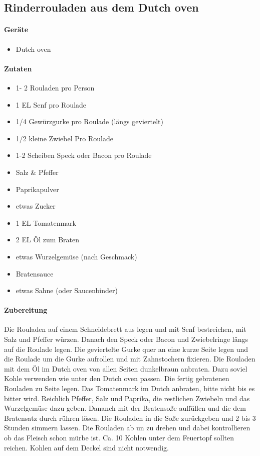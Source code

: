 \subsection{Rinderrouladen aus dem Dutch oven}

\paragraph{Geräte}

\begin{itemize}[noitemsep]
	\item Dutch oven
\end{itemize}

\paragraph{Zutaten}

\begin{itemize}[noitemsep]
	\item 1- 2 Rouladen pro Person
	\item 1 EL Senf pro Roulade
	\item 1/4 Gewürzgurke pro Roulade (längs geviertelt)
	\item 1/2 kleine Zwiebel Pro Roulade
	\item 1-2 Scheiben Speck oder Bacon pro Roulade
	\item Salz \& Pfeffer
	\item Paprikapulver
	\item etwas Zucker
	\item 1 EL Tomatenmark
	\item 2 EL Öl zum Braten
	\item etwas Wurzelgemüse (nach Geschmack)
	\item Bratensauce
	\item etwas Sahne (oder Saucenbinder)
\end{itemize}

\paragraph{Zubereitung}

Die Rouladen auf einem Schneidebrett aus legen und mit Senf bestreichen, 
mit Salz und Pfeffer würzen. Danach den Speck oder Bacon und 
Zwiebelringe längs auf die Roulade legen. Die geviertelte Gurke quer an 
eine kurze Seite legen und die Roulade um die Gurke aufrollen und mit 
Zahnstochern fixieren.
Die Rouladen mit dem Öl im Dutch oven von allen Seiten dunkelbraun 
anbraten. Dazu soviel Kohle verwenden wie unter den Dutch oven passen. 
Die fertig gebratenen Rouladen zu Seite legen. 
Das Tomatenmark im Dutch anbraten, bitte nicht bis es bitter wird. 
Reichlich Pfeffer, Salz und Paprika, die restlichen Zwiebeln und das 
Wurzelgemüse dazu geben. Dananch mit der Bratensoße auffüllen und die 
dem Bratensatz durch rühren lösen. Die Rouladen in die Soße zurückgeben 
und 2 bis 3 Stunden simmern lassen. Die Rouladen ab un zu drehen und 
dabei kontrollieren ob das Fleisch schon mürbe ist. Ca. 10 Kohlen unter 
dem Feuertopf sollten reichen. Kohlen auf dem Deckel sind nicht 
notwendig.
\newpage

